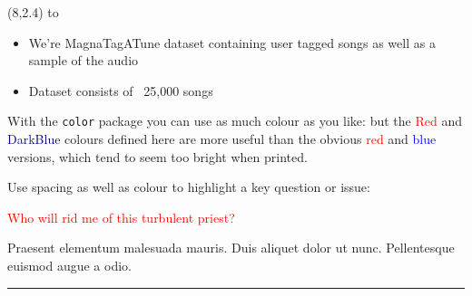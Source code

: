 \documentclass[a0]{a0poster}
\def\Head#1{\noindent\hbox to \hsize{\hfil{\LARGE\color{DarkBlue}\sf #1}}\bigskip}
\begin{document}
\begin{textblock}{7}(8,2.4)
\Head{Dataset}

\sf
\begin{itemize}
	\item We're MagnaTagATune dataset containing user tagged songs as well as a sample of the audio
	\item Dataset consists of ~25,000 songs
\end{itemize}

With the {\tt color} package you can use as much colour as you like: but the \textcolor{Red}{Red} and \textcolor{DarkBlue}{DarkBlue} colours defined here are more useful than the obvious \textcolor{red}{red} and \textcolor{blue}{blue} versions, which tend to seem too bright when printed.

Use spacing as well as colour to highlight a key question or issue: 
\vspace*{1.15\baselineskip}
\begin{center}
\textcolor{Red}{Who will rid me of this turbulent priest?}
\end{center} 
\vspace*{1.15\baselineskip}
Praesent elementum malesuada mauris. Duis aliquet dolor ut nunc. Pellentesque euismod augue a odio. 

\bigskip
\hrule
\end{textblock}
\end{document}
